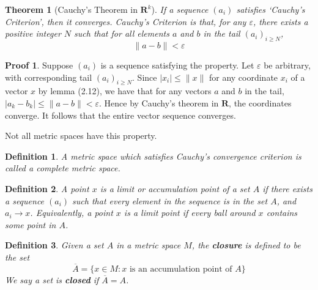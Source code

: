 \documentclass[12pt]{amsbook}
\theoremstyle{plain}
\newtheorem{definition}{Definition}
\newtheorem{theorem}{Theorem}
\theoremstyle{definition}
\newtheorem*{prf}{Proof}
\begin{document}
\begin{theorem}[Cauchy's Theorem in $\mathbf{R}^k$]
  If a sequence $(a_i)$ satisfies `Cauchy's Criterion', then it converges. Cauchy's Criterion is that, for any $\varepsilon$, there exists a positive integer $N$ such that for all elements $a$ and $b$ in the tail $(a_i)_{i \geq N}$,
  \[ \| a - b \| < \varepsilon \]
\end{theorem}
\begin{prf}
  Suppose $(a_i)$ is a sequence satisfying the property. Let $\varepsilon$ be arbitrary, with corresponding tail $(a_i)_{i \geq N}$. Since $|x_i| \leq \|x\|$ for any coordinate $x_i$ of a vector $x$ by lemma (2.12), we have that for any vectors $a$ and $b$ in the tail, $|a_k - b_k| \leq \|a - b\| < \varepsilon$. Hence by Cauchy's theorem in $\mathbf{R}$, the coordinates converge. It follows that the entire vector sequence converges.
\end{prf}

Not all metric spaces have this property.

\begin{definition}
  A metric space which satisfies Cauchy's convergence criterion is called a complete metric space.
\end{definition}

\begin{definition}
  A point $x$ is a limit or accumulation point of a set $A$ if there exists a sequence $(a_i)$ such that every element in the sequence is in the set $A$, and $a_i \to x$. Equivalently, a point $x$ is a limit point if every ball around $x$ contains some point in $A$.
\end{definition}

\begin{definition}
  Given a set $A$ in a metric space $M$, the {\bf closure} is defined to be the set
  \[ \overline{A} = \{ x \in M : \text{$x$ is an accumulation point of $A$} \} \]
  We say a set is {\bf closed} if $\overline{A} = A$.
\end{definition}
\end{document}
